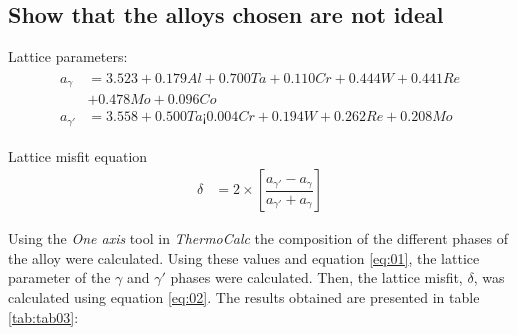 \clearpage
\section{}

\subsection{Show that the alloys chosen are not ideal}

Lattice parameters:
\begin{align}
  \label{eq:01}
    \begin{split}
        a_\gamma &= 3.523 + 0.179 Al + 0.700Ta + 0.110 Cr + 0.444W+ 0.441 Re \\
        & + 0.478Mo + 0.096 Co \\
        a_{\gamma'} &= 3.558 + 0.500Ta ¡ 0.004 Cr + 0.194W+ 0.262 Re + 0.208Mo
    \end{split}
\end{align}

Lattice misfit equation
\begin{align}
  \label{eq:02}
    \delta &= 2\times\left[\dfrac{a_{\gamma'}-a_\gamma}{a_{\gamma'}+a_\gamma}\right]
\end{align}

Using the \textit{One axis} tool in \textit{ThermoCalc} the composition of the different phases of the alloy were calculated. Using these values and equation \ref{eq:01}, the lattice parameter of the $\gamma$ and $\gamma'$ phases were calculated. Then, the lattice misfit, $\delta$, was calculated using equation \ref{eq:02}. The results obtained are presented in table \ref{tab:tab03}:

